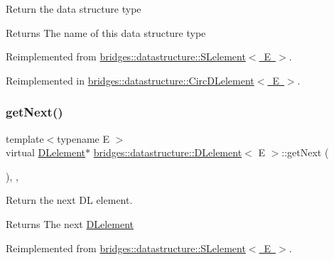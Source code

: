 Return the data structure type

\begin{DoxyReturn}{Returns}
The name of this data structure type 
\end{DoxyReturn}


Reimplemented from \mbox{\hyperlink{classbridges_1_1datastructure_1_1_s_lelement_a602156aacacd73d1faa365d68d8af31b}{bridges\+::datastructure\+::\+S\+Lelement$<$ E $>$}}.



Reimplemented in \mbox{\hyperlink{classbridges_1_1datastructure_1_1_circ_d_lelement_aec7f9b9dc6626c1a872feb91cd65425d}{bridges\+::datastructure\+::\+Circ\+D\+Lelement$<$ E $>$}}.

\mbox{\label{classbridges_1_1datastructure_1_1_d_lelement_a63212051ea77d74bd751dea00288d2be}} 
\subsubsection{\texorpdfstring{getNext()}{getNext()}\hspace{0.1cm}{\footnotesize\ttfamily [1/2]}}
{\footnotesize\ttfamily template$<$typename E $>$ \\
virtual \mbox{\hyperlink{classbridges_1_1datastructure_1_1_d_lelement}{D\+Lelement}}$\ast$ \mbox{\hyperlink{classbridges_1_1datastructure_1_1_d_lelement}{bridges\+::datastructure\+::\+D\+Lelement}}$<$ E $>$\+::get\+Next (\begin{DoxyParamCaption}{ }\end{DoxyParamCaption})\hspace{0.3cm}{\ttfamily [inline]}, {\ttfamily [override]}, {\ttfamily [virtual]}}

Return the next DL element.

\begin{DoxyReturn}{Returns}
The next \mbox{\hyperlink{classbridges_1_1datastructure_1_1_d_lelement}{D\+Lelement}} 
\end{DoxyReturn}


Reimplemented from \mbox{\hyperlink{classbridges_1_1datastructure_1_1_s_lelement_ae43dd771d9ced7cb17f1d35f34cd9a42}{bridges\+::datastructure\+::\+S\+Lelement$<$ E $>$}}.



